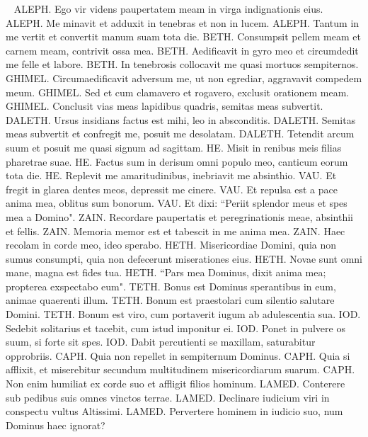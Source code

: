 \begin{biblechapter}   
\verse ALEPH. Ego vir videns paupertatem meam in virga indignationis eius. 
\verse ALEPH. Me minavit et adduxit in tenebras et non in lucem. 
\verse ALEPH. Tantum in me vertit et convertit manum suam tota die. 
\verse BETH. Consumpsit pellem meam et carnem meam, contrivit ossa mea. 
\verse BETH. Aedificavit in gyro meo et circumdedit me felle et labore. 
\verse BETH. In tenebrosis collocavit me quasi mortuos sempiternos. 
\verse GHIMEL. Circumaedificavit adversum me, ut non egrediar, aggravavit compedem meum. 
\verse GHIMEL. Sed et cum clamavero et rogavero, exclusit orationem meam. 
\verse GHIMEL. Conclusit vias meas lapidibus quadris, semitas meas subvertit. 
\verse DALETH. Ursus insidians factus est mihi, leo in absconditis. 
\verse DALETH. Semitas meas subvertit et confregit me, posuit me desolatam. 
\verse DALETH. Tetendit arcum suum et posuit me quasi signum ad sagittam. 
\verse HE. Misit in renibus meis filias pharetrae suae. 
\verse HE. Factus sum in derisum omni populo meo, canticum eorum tota die. 
\verse HE. Replevit me amaritudinibus, inebriavit me absinthio. 
\verse VAU. Et fregit in glarea dentes meos, depressit me cinere. 
\verse VAU. Et repulsa est a pace anima mea, oblitus sum bonorum. 
\verse VAU. Et dixi: “Periit splendor meus et spes mea a Domino". 
\verse ZAIN. Recordare paupertatis et peregrinationis meae, absinthii et fellis. 
\verse ZAIN. Memoria memor est et tabescit in me anima mea. 
\verse ZAIN. Haec recolam in corde meo, ideo sperabo. 
\verse HETH. Misericordiae Domini, quia non sumus consumpti, quia non defecerunt miserationes eius. 
\verse HETH. Novae sunt omni mane, magna est fides tua. 
\verse HETH. “Pars mea Dominus, dixit anima mea; propterea exspectabo eum". 
\verse TETH. Bonus est Dominus sperantibus in eum, animae quaerenti illum. 
\verse TETH. Bonum est praestolari cum silentio salutare Domini. 
\verse TETH. Bonum est viro, cum portaverit iugum ab adulescentia sua. 
\verse IOD. Sedebit solitarius et tacebit, cum istud imponitur ei. 
\verse IOD. Ponet in pulvere os suum, si forte sit spes. 
\verse IOD. Dabit percutienti se maxillam, saturabitur opprobriis. 
\verse CAPH. Quia non repellet in sempiternum Dominus. 
\verse CAPH. Quia si afflixit, et miserebitur secundum multitudinem misericordiarum suarum. 
\verse CAPH. Non enim humiliat ex corde suo et affligit filios hominum. 
\verse LAMED. Conterere sub pedibus suis omnes vinctos terrae. 
\verse LAMED. Declinare iudicium viri in conspectu vultus Altissimi. 
\verse LAMED. Pervertere hominem in iudicio suo, num Dominus haec ignorat? 

\end{biblechapter}
